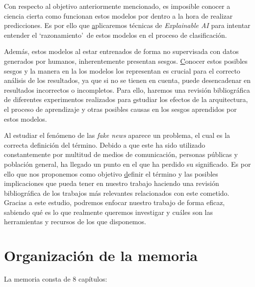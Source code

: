 Con respecto al objetivo anteriormente mencionado, es imposible conocer a ciencia cierta como funcionan estos modelos por dentro a la hora de realizar predicciones. Es por ello que {\ul aplicaremos técnicas de \textit{Explainable AI} para intentar entender el `razonamiento'\ de estos modelos en el proceso de clasificación}.

Además, estos modelos al estar entrenados de forma no supervisada con datos generados por humanos, inherentemente presentan sesgos. {\ul Conocer estos posibles sesgos y la manera en la los modelos los representan} es crucial para el correcto análisis de los resultados, ya que si no se tienen en cuenta, puede desencadenar en resultados incorrectos o incompletos. Para ello, haremos una revisión bibliográfica de diferentes experimentos realizados para {\ul estudiar los efectos de la arquitectura, el proceso de aprendizaje y otras posibles causas en los sesgos} aprendidos por estos modelos.

Al estudiar el fenómeno de las \emph{fake news} aparece un problema, el cual es la correcta definición del término. Debido a que este ha sido utilizado constantemente por multitud de medios de comunicación, personas públicas y población general, ha llegado un punto en el que ha perdido su significado. Es por ello que nos proponemos como objetivo {\ul definir el término y las posibles implicaciones que pueda tener en nuestro trabajo} haciendo una revisión bibliográfica de los trabajos más relevantes relacionados con este cometido. Gracias a este estudio, podremos enfocar nuestro trabajo de forma eficaz, sabiendo qué es lo que realmente queremos investigar y cuáles son las herramientas y recursos de los que disponemos.

\section{Organización de la memoria}

La memoria consta de 8 capítulos:

